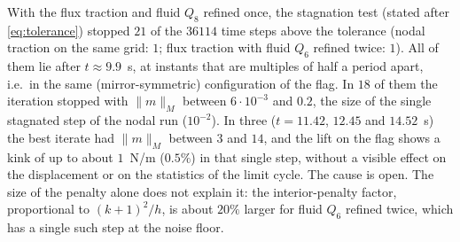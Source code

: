 \documentclass[11pt,a4paper]{article}
\theoremstyle{definition}
\theoremstyle{remark}
\newcommand{\M}{M}
\begin{document}
With the flux traction and fluid $Q_8$ refined once, the stagnation test (stated after
\eqref{eq:tolerance}) stopped $21$ of the $36114$ time steps above the tolerance (nodal traction on
the same grid: $1$; flux traction with fluid $Q_6$ refined twice: $1$). All of them lie after
$t\approx9.9$~s, at instants that are multiples of half a period apart, i.e.\ in the same
(mirror-symmetric) configuration of the flag. In $18$ of them the iteration stopped with
$\|m\|_{\M}$ between $6\cdot10^{-3}$ and $0.2$, the size of the single stagnated step of the nodal
run ($10^{-2}$). In three ($t=11.42$, $12.45$ and $14.52$~s) the best iterate had $\|m\|_{\M}$
between $3$ and $14$, and the lift on the flag shows a kink of up to about $1$~N/m ($0.5\%$) in
that single step, without a visible effect on the displacement or on the statistics of the limit
cycle. The cause is open. The size of the penalty
alone does not explain it: the interior-penalty factor, proportional to $(k+1)^2/h$, is about
$20\%$ larger for fluid $Q_6$ refined twice, which has a single such step at the noise floor.

\begin{table}[ht]\centering
\caption{Periodic regime of FSI2, $t\in[12.5,15]$, secant method on the native formulation, Bossak
$\rho_\infty=0$, structure $Q_4$, mapping of degree $4$, dual-splitting fluid solver: mean $\pm$
amplitude [frequency] of the tip displacement.}\label{tab:final}
\end{table}
\end{document}
